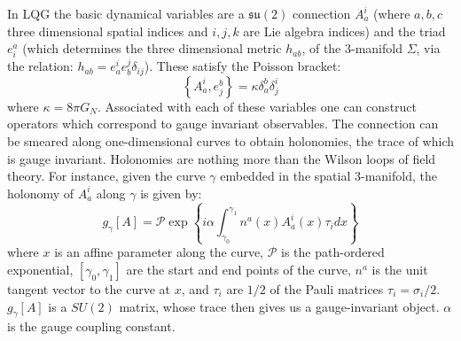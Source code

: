 \documentclass{ws-mpla}
\newcommand{\mc}[1]{\mathcal{#1}}
\newcommand{\mf}[1]{\mathfrak{#1}}
\begin{document}
In LQG the basic dynamical variables are \cite{Ashtekar2004Background} a $ \mf{su}(2) $ connection $ A_a^i $ (where $ a,b,c $ three dimensional spatial indices and $ i,j,k $ are Lie algebra indices) and the triad  $ e^a_i $ (which determines the three dimensional metric $ h_{ab} $, of the 3-manifold $ \Sigma $, via the relation: $ h_{ab} = e_a^i e_b^j \delta_{ij} $). These satisfy the Poisson bracket:
\begin{equation}\label{eqn:poisson-bracket}
	\left\{ A_a^i, e^b_j \right\} = \kappa \delta^b_a \delta^i_j
\end{equation}
where $ \kappa = 8 \pi G_N $. Associated with each of these variables one can construct operators which correspond to gauge invariant observables. The connection can be smeared along one-dimensional curves to obtain holonomies, the trace of which is gauge invariant. Holonomies are nothing more than the Wilson loops of field theory. For instance, given the curve $ \gamma $ embedded in the spatial 3-manifold, the holonomy of $ A_a^i $ along $ \gamma $ is given by:
\begin{equation}\label{eqn:holonomy}
	g_\gamma[A] = \mc{P} \exp \left\{ i \alpha \int_{\gamma_0}^{\gamma_1} n^a(x) A_a^i(x) \tau_i dx  \right\}
\end{equation}
where $ x $ is an affine parameter along the curve, $ \mc{P} $ is the path-ordered exponential, $ [\gamma_0, \gamma_1] $ are the start and end points of the curve, $ n^a $ is the unit tangent vector to the curve at $ x $, and $ \tau_i $ are $ 1/2 $ of the Pauli matrices $ \tau_i = \sigma_i/2 $. $ g_\gamma[A] $ is a $ SU(2) $ matrix, whose trace then gives us a gauge-invariant object. $ \alpha $ is the gauge coupling constant.
\end{document}
